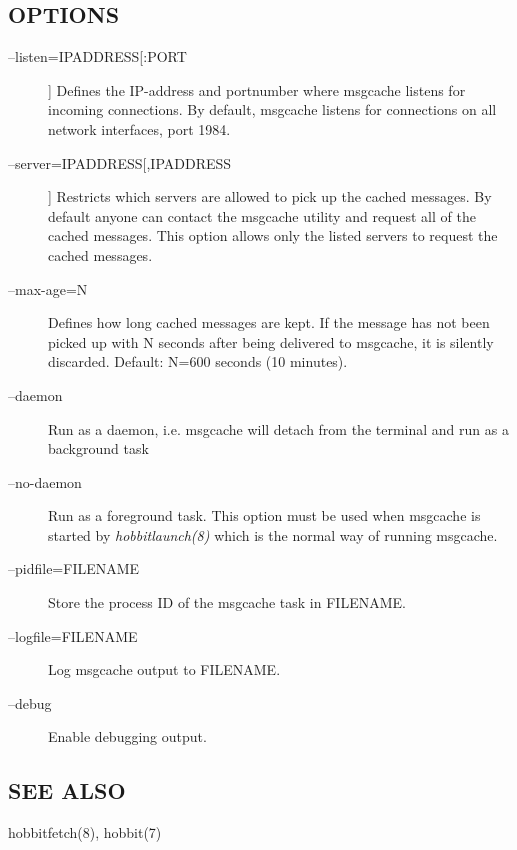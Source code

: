 \subsection{OPTIONS}
\begin{description}
\item[--listen=IPADDRESS[:PORT]] Defines the IP-address and portnumber where msgcache listens for incoming connections. By default, msgcache listens for connections on all network interfaces, port 1984. 

 

\item[--server=IPADDRESS[,IPADDRESS]] Restricts which servers are allowed to pick up the cached messages. By default anyone can contact the msgcache utility and request all of the cached messages. This option allows only the listed servers to request the cached messages. 

 

\item[--max-age=N] Defines how long cached messages are kept. If the message has not been picked up with N seconds after being delivered to msgcache, it is silently discarded. Default: N=600 seconds (10 minutes). 

 

\item[--daemon] Run as a daemon, i.e. msgcache will detach from the terminal and run as a background task 

 

\item[--no-daemon] Run as a foreground task. This option must be used when msgcache is started by \emph{hobbitlaunch(8)}
 which is the normal way of running msgcache. 

 

\item[--pidfile=FILENAME] Store the process ID of the msgcache task in FILENAME. 

 

\item[--logfile=FILENAME] Log msgcache output to FILENAME. 

 

\item[--debug] Enable debugging output. 

 


\end{description}
\subsection{SEE ALSO}
hobbitfetch(8), hobbit(7) 
  
